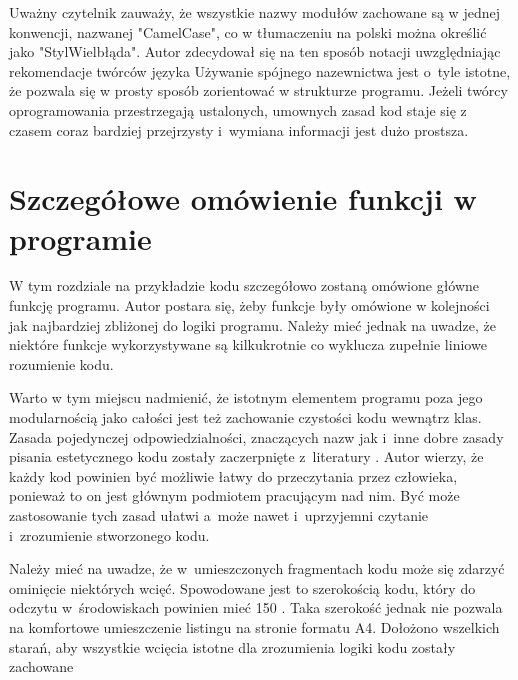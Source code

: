 \documentclass[eng,printmode]{mgr}
\begin{document}
Uważny czytelnik zauważy, że wszystkie nazwy modułów zachowane są w jednej konwencji, nazwanej "CamelCase", co w tłumaczeniu na polski można określić jako "StylWielbłąda". Autor zdecydował się na ten sposób notacji uwzględniając rekomendacje twórców języka \cite{PEP8}Używanie spójnego nazewnictwa jest o~tyle istotne, że pozwala się w prosty sposób zorientować w strukturze programu. Jeżeli twórcy oprogramowania przestrzegają ustalonych, umownych zasad kod staje się z czasem coraz bardziej przejrzysty i~wymiana informacji jest dużo prostsza. 

\chapter{Szczegółowe omówienie funkcji w programie}
W tym rozdziale na przykładzie kodu szczegółowo zostaną omówione główne funkcję programu. Autor postara się, żeby funkcje były omówione w kolejności jak najbardziej zbliżonej do logiki programu. Należy mieć jednak na uwadze, że niektóre funkcje wykorzystywane są kilkukrotnie co wyklucza zupełnie liniowe rozumienie kodu.

Warto w tym miejscu nadmienić, że istotnym elementem programu poza jego modularnością jako całości jest też zachowanie czystości kodu wewnątrz klas. Zasada pojedynczej odpowiedzialności, znaczących nazw jak i~inne dobre zasady pisania estetycznego kodu zostały zaczerpnięte z~literatury \cite{Czysty_kod}. Autor wierzy, że każdy kod powinien być możliwie łatwy do przeczytania przez człowieka, ponieważ to on jest głównym podmiotem pracującym nad nim. Być może zastosowanie tych zasad ułatwi a~może nawet i~uprzyjemni czytanie i~zrozumienie stworzonego kodu. 

Należy mieć na uwadze, że w~umieszczonych fragmentach kodu może się zdarzyć ominięcie niektórych wcięć. Spowodowane jest to szerokością kodu, który do odczytu w~środowiskach powinien mieć 150 \cite{PEP8}. Taka szerokość jednak nie pozwala na komfortowe umieszczenie listingu na stronie formatu A4. Dołożono wszelkich starań, aby wszystkie wcięcia istotne dla zrozumienia logiki kodu zostały zachowane
\newpage
\end{document}
